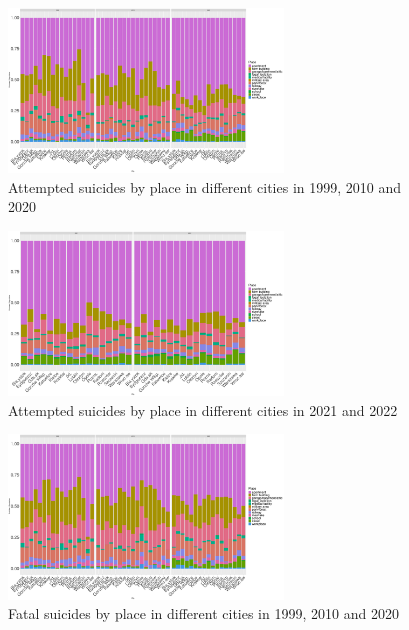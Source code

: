 \documentclass{article}
\begin{document}
\begin{figure}[H]
    \centering
    \includegraphics[width=0.65\textwidth]{imgs/place_city_att_suicides-991020.pdf}
    \caption{Attempted suicides by place in different cities in 1999, 2010 and 2020}
    \label{fig:place_city_att_suicides-991020}
\end{figure}
%
\begin{figure}[H]
    \centering
    \includegraphics[width=0.65\textwidth]{imgs/place_city_att_suicides-2122.pdf}
    \caption{Attempted suicides by place in different cities in 2021 and 2022}
    \label{fig:place_city_att_suicides-2122}
\end{figure}
%
\begin{figure}[H]
    \centering
    \includegraphics[width=0.65\textwidth]{imgs/place_city_fat_suicides-991020.pdf}
    \caption{Fatal suicides by place in different cities in 1999, 2010 and 2020}
    \label{fig:place_city_fat_suicides-991020}
\end{figure}
\end{document}
